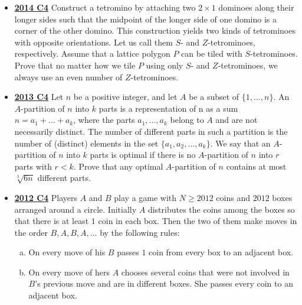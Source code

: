 \documentclass[11pt]{scrartcl}
\begin{document}
\begin{itemize}[leftmargin=*]
\begin{enumerate}[(a)]
\end{enumerate}
The player $A$ takes the first turn. Determine the outcome of the game, assuming that both players use optimal strategies. 
\item \href{https://artofproblemsolving.com/community/c6h1113185p5083550}{\textbf{2014 C4}} Construct a tetromino by attaching two $2 \times 1$ dominoes along their longer sides such that the midpoint of the longer side of one domino is a corner of the other domino. This construction yields two kinds of tetrominoes with opposite orientations. Let us call them $S$- and $Z$-tetrominoes, respectively.
Assume that a lattice polygon $P$ can be tiled with $S$-tetrominoes. Prove that no matter how we tile $P$ using only $S$- and $Z$-tetrominoes, we always use an even number of $Z$-tetrominoes. 
\item \href{https://artofproblemsolving.com/community/c6h597131p3543403}{\textbf{2013 C4}} Let $n$ be a positive integer, and let $A$ be a subset of $\{ 1,\dots ,n\}$. An $A$-partition of $n$ into $k$ parts is a representation of n as a sum $n = a_1 + \dots + a_k$, where the parts $a_1 , \dots , a_k $ belong to $A$ and are not necessarily distinct. The number of different parts in such a partition is the number of (distinct) elements in the set $\{ a_1 , a_2 , \dots , a_k \} $.
We say that an $A$-partition of $n$ into $k$ parts is optimal if there is no $A$-partition of $n$ into $r$ parts with $r<k$. Prove that any optimal $A$-partition of $n$ contains at most $\sqrt[3]{6n}$ different parts. 
\item \href{https://artofproblemsolving.com/community/c6h546171p3160567}{\textbf{2012 C4}} 	Players $A$ and $B$ play a game with $N \geqslant  2012$ coins and $2012$ boxes arranged around a circle. Initially $A$ distributes the coins among the boxes so that there is at least $1$ coin in each box. Then the two of them make moves in the order $B,A,B,A,\dots $ by the following rules:
\begin{enumerate}[(a)]
    \item On every move of his $B$ passes $1$ coin from every box to an adjacent box.
\item  On every move of hers $A$ chooses several coins that were not involved in $B$'s previous move and are in different boxes. She passes every coin to an adjacent box.
\end{enumerate}


\end{itemize}
\end{document}
